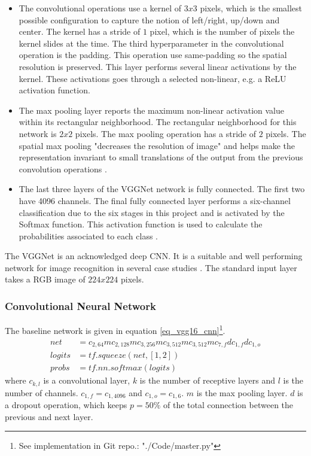 \begin{itemize}
\item The convolutional operations use a kernel of $3x3$ pixels, which is the smallest possible configuration to capture the notion of left/right, up/down and center. The kernel has a stride of $1$ pixel, which is the number of pixels the kernel slides at the time.
The third hyperparameter in the convolutional operation is the padding. This operation use same-padding so the spatial resolution is preserved. This layer performs several linear activations by the kernel. These activations goes through a selected non-linear, e.g. a ReLU activation function.
\item The max pooling layer reports the maximum non-linear activation value within its rectangular neighborhood. The rectangular neighborhood for this network is $2x2$ pixels. The max pooling operation has a stride of $2$ pixels. The spatial max pooling "decreases the resolution of image" and helps make the representation invariant to small translations of the output from the previous convolution operations \cite[sec. 9]{dl_book}.
	\item The last three layers of the VGGNet network is fully connected. The first two have 4096 channels. The final fully connected layer performs a six-channel classification due to the six stages in this project and is activated by the Softmax function. This activation function is used to calculate the probabilities associated to each class \cite[eq. 4.1]{dl_book}.  
\end{itemize}
The VGGNet is an acknowledged deep CNN. It is a suitable and well performing network for image recognition in several case studies \cite{VGGnet16, stand_cnn_notes}.  
The standard input layer takes a RGB image of $224x224$ pixels.


\subsubsection{Convolutional Neural Network}

The baseline network is given in equation \ref{eq_vgg16_cnn}\footnote{See implementation in Git repo.: "./Code/master.py"}. 
\begin{equation}
\begin{aligned}
net &= c_{2,64}mc_{2,128}mc_{3,256}mc_{3,512}mc_{3,512}m c_{7,f} d c_{1, f} dc_{1,o}	\\
logits &= tf.squeeze(net, [1, 2])\\
probs &= tf.nn.softmax(logits)
\end{aligned}
\label{eq_vgg16_cnn}
\end{equation}
where $c_{k,l}$ is a convolutional layer, $k$ is the number of receptive layers and $l$ is the number of channels. $c_{1,f} = c_{1,4096}$ and $c_{1,o} = c_{1,6}$.
$m$ is the max pooling layer. $d$ is a dropout operation, which keeps  $p = 50\%$ of the total connection between the previous and next layer. 

